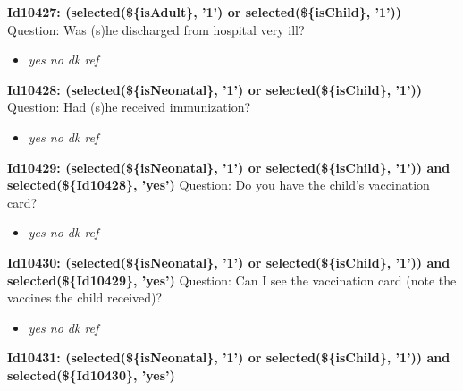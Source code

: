 \documentclass{article}%
\begin{document}
\textbf{Id10427: (selected(\$\{isAdult\}, '1') or selected(\$\{isChild\}, '1')) \newline%
}%
Question: Was (s)he discharged from hospital very ill?\newline%
%
\begin{itemize}%
\item%
\textit{yes\newline%
 no\newline%
 dk\newline%
 ref\newline%
}%
\end{itemize}%
\textbf{Id10428: (selected(\$\{isNeonatal\}, '1') or selected(\$\{isChild\}, '1'))\newline%
}%
Question: Had (s)he received immunization?\newline%
%
\begin{itemize}%
\item%
\textit{yes\newline%
 no\newline%
 dk\newline%
 ref\newline%
}%
\end{itemize}%
\textbf{Id10429: (selected(\$\{isNeonatal\}, '1') or selected(\$\{isChild\}, '1')) and selected(\$\{Id10428\}, 'yes')\newline%
}%
Question: Do you have the child's vaccination card?\newline%
%
\begin{itemize}%
\item%
\textit{yes\newline%
 no\newline%
 dk\newline%
 ref\newline%
}%
\end{itemize}%
\textbf{Id10430: (selected(\$\{isNeonatal\}, '1') or selected(\$\{isChild\}, '1')) and selected(\$\{Id10429\}, 'yes')\newline%
}%
Question: Can I see the vaccination card (note the vaccines the child received)?\newline%
%
\begin{itemize}%
\item%
\textit{yes\newline%
 no\newline%
 dk\newline%
 ref\newline%
}%
\end{itemize}%
\textbf{Id10431: (selected(\$\{isNeonatal\}, '1') or selected(\$\{isChild\}, '1')) and selected(\$\{Id10430\}, 'yes')\newline%
}%
\end{document}
